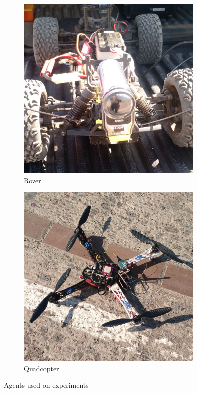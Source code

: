 \begin{figure}
        \centering
        \begin{subfigure}[b]{0.3\textwidth}
                \includegraphics[width=\textwidth]{img/rover.jpg}
                \caption{Rover}
                \label{fig:rover}
        \end{subfigure}
        \quad
        \begin{subfigure}[b]{0.3\textwidth}
                \includegraphics[width=\textwidth]{img/quad.jpg}
                \caption{Quadcopter}
                \label{fig:quad}
        \end{subfigure}
        \caption{Agents used on experiments}
        \label{fig:agents}
\end{figure}


